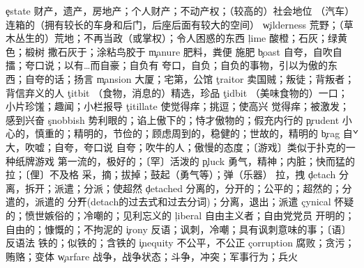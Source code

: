 \begin{multicols}{2}
\c{estate}  \n 财产，遗产，房地产；个人财产；不动产权；（较高的）社会地位 \a （汽车）连箱的（拥有较长的车身和后门，后座后面有较大的空间）
\c{wilderness}  \n 荒野；（草木丛生的）荒地；不再当政（或掌权）；令人困惑的东西
\c{lime}  \n 酸橙；石灰；绿黄色；椴树 \vt 撒石灰于；涂粘鸟胶于
\c{manure}  \n 肥料，粪便 \vt 施肥
\c{boast}  \vt 自夸，自吹自擂；夸口说；以有…而自豪；自负有 \n 夸口，自负；自负的事物，引以为傲的东西；自夸的话；扬言
\c{mansion}  \n 大厦；宅第，公馆
\c{traitor}  \n 卖国贼；叛徒；背叛者；背信弃义的人
\c{titbit}  \n （食物，消息的）精选，珍品
\c{tidbit}  \n （美味食物的）一口；小片珍馐；趣闻；小栏报导
\c{titillate}  \vt 使觉得痒；挑逗；使高兴 \vi 觉得痒；被激发；感到兴奋
\c{snobbish}  \a 势利眼的；谄上傲下的；恃才傲物的；假充内行的
\c{prudent}  \a 小心的，慎重的；精明的，节俭的；顾虑周到的，稳健的；世故的，精明的
\c{brag}  \v 自大，吹嘘；自夸，夸口说 \n 自夸；吹牛的人；傲慢的态度；〔游戏〕类似于扑克的一种纸牌游戏 \a 第一流的，极好的；〔罕〕活泼的
\c{pluck}  \n 勇气，精神；内脏；快而猛的拉；〔俚〕不及格 \vt 采，摘；拔掉；鼓起（勇气等）；弹（乐器） \vi 拉，拽
\c{detach}  \vt 分离，拆开；派遣；分派；使超然
\c{detached}  \a 分离的，分开的；公平的；超然的；分遣的，派遣的 \v 分开(detach的过去式和过去分词)；分离，退出；派遣
\c{cynical}  \a 怀疑的；愤世嫉俗的；冷嘲的；见利忘义的
\c{liberal}  \n 自由主义者；自由党党员 \a 开明的；自由的；慷慨的；不拘泥的
\c{irony}  \n 反语；讽刺，冷嘲；具有讽刺意味的事；〔语〕反语法 \a 铁的；似铁的；含铁的
\c{inequity}  \n 不公平，不公正
\c{corruption}  \n 腐败；贪污；贿赂；变体
\c{warfare}  \n 战争，战争状态；斗争，冲突；军事行为；兵火
\end{multicols}


